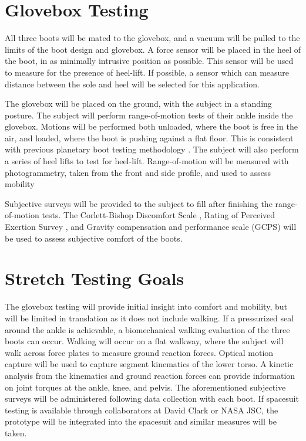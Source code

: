 \documentclass[defaultstyle,11pt]{comps}
\begin{document}
\hypertarget{glovebox-testing}{%
\section{Glovebox Testing}\label{glovebox-testing}}

All three boots will be mated to the glovebox, and a vacuum will be pulled to the limits of the boot design and glovebox.
A force sensor will be placed in the heel of the boot, in as minimally intrusive position as possible.
This sensor will be used to measure for the presence of heel-lift.
If possible, a sensor which can measure distance between the sole and heel will be selected for this application.

The glovebox will be placed on the ground, with the subject in a standing posture.
The subject will perform range-of-motion tests of their ankle inside the glovebox.
Motions will be performed both unloaded, where the boot is free in the air, and loaded, where the boot is pushing against a flat floor.
This is consistent with previous planetary boot testing methodology \citep{Ross2002}.
The subject will also perform a series of heel lifts to test for heel-lift.
Range-of-motion will be measured with photogrammetry, taken from the front and side profile, and used to assess mobility

Subjective surveys will be provided to the subject to fill after finishing the range-of-motion tests. The Corlett-Bishop Discomfort Scale \citep{Corlett1976}, Rating of Perceived Exertion Survey \citep{Borg1982}, and Gravity compensation and performance scale (GCPS) \citep{Gernhardt2009, Norcross2009, Norcross2010} will be used to assess subjective comfort of the boots.

\hypertarget{stretch-testing-goals}{%
\section{Stretch Testing Goals}\label{stretch-testing-goals}}

The glovebox testing will provide initial insight into comfort and mobility, but will be limited in translation as it does not include walking.
If a pressurized seal around the ankle is achievable, a biomechanical walking evaluation of the three boots can occur.
Walking will occur on a flat walkway, where the subject will walk across force plates to measure ground reaction forces.
Optical motion capture will be used to capture segment kinematics of the lower torso.
A kinetic analysis from the kinematics and ground reaction forces can provide information on joint torques at the ankle, knee, and pelvis.
The aforementioned subjective surveys will be administered following data collection with each boot.
If spacesuit testing is available through collaborators at David Clark or NASA JSC, the prototype will be integrated into the spacesuit and similar measures will be taken.
\end{document}
